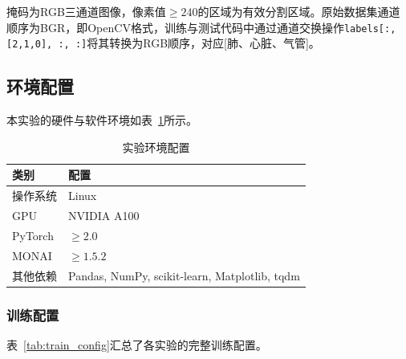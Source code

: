 \documentclass[12pt, a4paper]{article}
\begin{document}
掩码为RGB三通道图像，像素值$\geq 240$的区域为有效分割区域。原始数据集通道顺序为BGR，即OpenCV格式，训练与测试代码中通过通道交换操作\texttt{labels[:, [2,1,0], :, :]}将其转换为RGB顺序，对应[肺、心脏、气管]。

\subsection{环境配置}
\label{sec:env}

本实验的硬件与软件环境如表~\ref{tab:env}所示。

\begin{table}[H]
    \centering
    \caption{实验环境配置}
    \label{tab:env}
    \begin{tabular}{@{}ll@{}}
        \toprule
        \textbf{类别} & \textbf{配置} \\
        \midrule
        操作系统 & Linux \\
        GPU & NVIDIA A100 \\
        PyTorch & $\geq 2.0$ \\
        MONAI & $\geq 1.5.2$ \\
        其他依赖 & Pandas, NumPy, scikit-learn, Matplotlib, tqdm \\
        \bottomrule
    \end{tabular}
\end{table}

\subsubsection{训练配置}

表~\ref{tab:train_config}汇总了各实验的完整训练配置。
\end{document}
